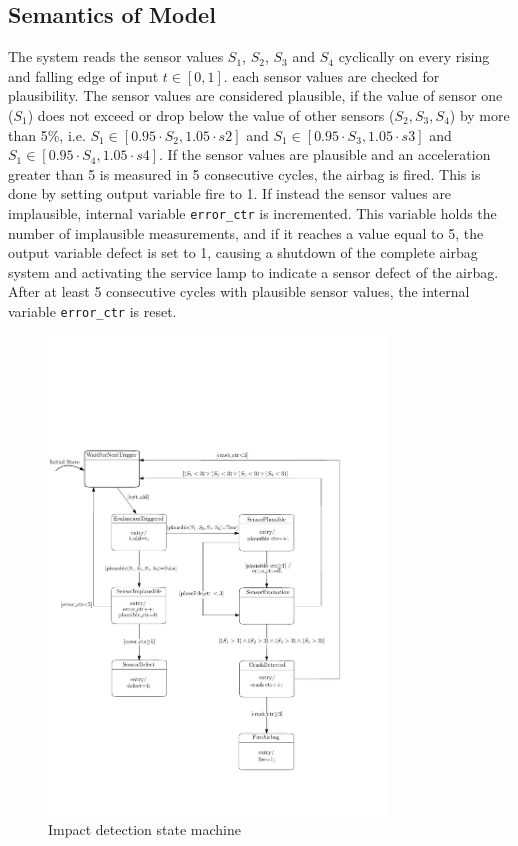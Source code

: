\documentclass[12pt	]{article}
\begin{document}
\subsection{Semantics of Model}
The system reads the sensor values $S_1$, $S_2$, $S_3$ and $S_4$ cyclically on every rising and falling edge of input $t \in [0, 1]$. each sensor values are checked for plausibility. The sensor values are considered plausible, if the value of sensor one ($S_1$) does not exceed or drop below the value of other sensors ($S_2, S_3, S_4$) by more than 5\%, i.e. $S_1 \in [0.95 \cdot S_2, 1.05 \cdot s2]$ and $S_1 \in [0.95 \cdot S_3, 1.05 \cdot s3]$ and $S_1 \in [0.95 \cdot S_4, 1.05 \cdot s4]$. If the sensor values
are plausible and an acceleration greater than 5 is measured in 5 consecutive cycles, the airbag is fired. This is done by setting output variable fire to 1. If instead the sensor values are implausible, internal variable \texttt{error\_ctr} is incremented. This variable holds the number of implausible measurements, and if it reaches a value equal to 5, the output variable defect is set to 1, causing a shutdown of the complete airbag system and activating the service lamp to indicate a sensor defect of the airbag. After at least 5 consecutive cycles with plausible sensor values, the internal variable \texttt{error\_ctr} is reset.


\begin{figure}[h]
	\centering
	\includegraphics[width=0.8\textwidth]{Images/Ipe/FSM.pdf}
	\caption{Impact detection state machine}
	\label{fig:Impact detection state machine}
\end{figure}
\end{document}
